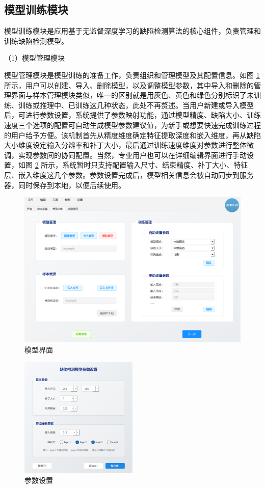 \documentclass[
  ]{njuthesis}
\begin{document}
\subsection{模型训练模块}

模型训练模块是应用基于无监督深度学习的缺陷检测算法的核心组件，负责管理和训练缺陷检测模型。

（1）模型管理模块

模型管理模块是模型训练的准备工作，负责组织和管理模型及其配置信息。如图 \ref{模型界面} 所示，用户可以创建、导入、删除模型，以及调整模型参数，其中导入和删除的管理界面与样本管理模块类似，唯一的区别就是用灰色、黄色和绿色分别标识了未训练、训练或推理中、已训练这几种状态，此处不再赘述。当用户新建或导入模型后，可进行参数设置，系统提供了参数映射功能，通过模型精度、缺陷大小、训练速度三个选项的配置可自动生成模型参数建议值，为新手或想要快速完成训练过程的用户给予方便。该机制首先从精度维度确定特征提取深度和嵌入维度，再从缺陷大小维度设定输入分辨率和补丁大小，最后通过训练速度维度对参数进行整体微调，实现参数间的协同配置。当然，专业用户也可以在详细编辑界面进行手动设置，如图 \ref{参数设置} 所示，系统暂时只支持配置输入尺寸、结束精度、补丁大小、特征层、嵌入维度这几个参数。参数设置完成后，模型相关信息会被自动同步到服务器，同时保存到本地，以便后续使用。

\begin{figure}[H]
    \centering
    \includegraphics[width=\textwidth]{images/模型界面.png}
    \caption{模型界面}
    \label{模型界面}
\end{figure}

\begin{figure}[htb]
    \centering
    \includegraphics[width=0.5\textwidth]{images/参数设置.png}
    \caption{参数设置}
    \label{参数设置}
\end{figure}
\end{document}
